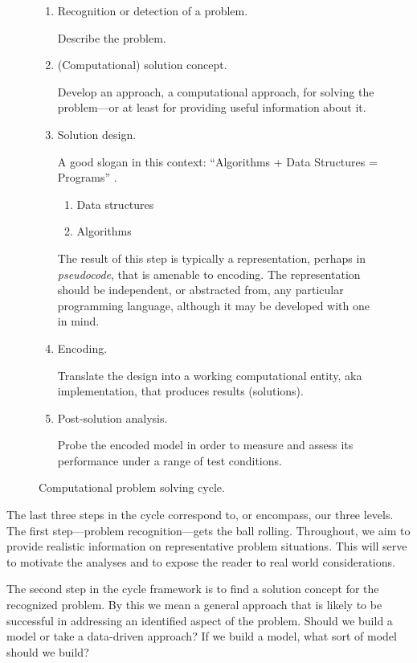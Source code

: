 \begin{figure}[t]
\figtop
\begin{enumerate}
\item Recognition or detection of a problem.

Describe the problem.
\item (Computational) solution concept.

Develop an approach, a computational approach, for solving the problem---or at least for providing useful information about it.
\item Solution design.

A good slogan in this context: ``Algorithms + Data Structures = Programs'' \cite{wirth_1976}.
\begin{enumerate}
\item Data structures
\item Algorithms
\end{enumerate}
The result of this step is typically a representation, perhaps in \emph{pseudocode}, that is amenable to encoding. The representation should be independent, or abstracted from, any particular programming language, although it may be developed with one in mind.
\item Encoding.

Translate the design into a working computational entity, aka implementation, that produces results (solutions).
\item Post-solution analysis.

Probe the encoded model in order to measure and assess its performance under a range of test conditions.

%
\end{enumerate}
\caption{Computational problem solving cycle.}
\label{fig:computational_problem_solving}
\figbot
\end{figure}
The last three steps in the cycle correspond to, or encompass, our three levels. The first step---problem recognition---gets the ball rolling. Throughout, we aim to provide realistic information on representative problem situations. This will serve to motivate the analyses and to expose the reader to real world considerations. 

The second step in the cycle framework is to find a solution concept for the recognized problem. By this we mean a general approach that is likely to be successful in addressing an identified aspect of the problem. Should we build a model or take a data-driven approach? If we build a model, what sort of model should we build? 

